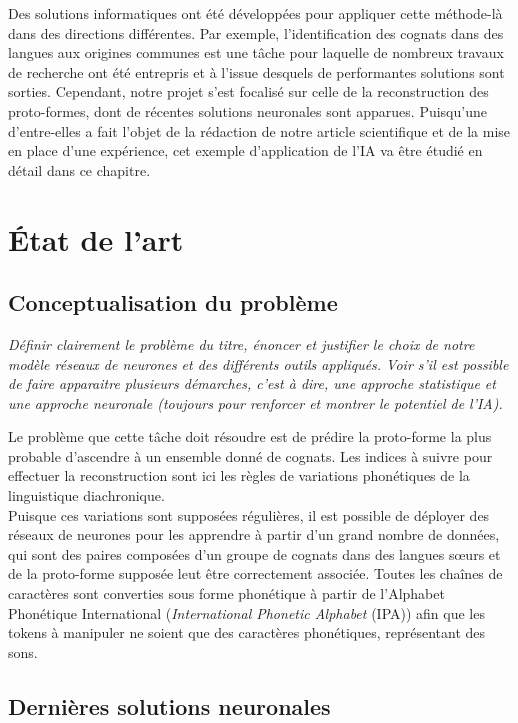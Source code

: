 \documentclass[12pt, french, twoside]{report}
\begin{document}
Des solutions informatiques ont été développées pour appliquer cette méthode-là dans des directions différentes. Par exemple, l'identification des cognats dans des langues aux origines communes est une tâche pour laquelle de nombreux travaux de recherche ont été entrepris et à l'issue desquels de performantes solutions sont sorties.\cite{fourrier}\cite[2: Related Works]{meloni-etal-2021-ab} Cependant, notre projet s'est focalisé sur celle de la reconstruction des proto-formes, dont de récentes solutions neuronales sont apparues. Puisqu'une d'entre-elles a fait l'objet de la rédaction de notre article scientifique et de la mise en place d'une expérience, cet exemple d'application de l'IA va être étudié en détail dans ce chapitre.
\section{État de l'art}
\subsection{Conceptualisation du problème}
\textit{Définir clairement le problème du titre, énoncer et justifier le choix de notre modèle réseaux de neurones et des différents outils appliqués. Voir s'il est possible de faire apparaitre plusieurs démarches, c'est à dire, une approche statistique et une approche neuronale (toujours pour renforcer et montrer le potentiel de l'IA).}

Le problème que cette tâche doit résoudre est de prédire la proto-forme la plus probable d'ascendre à un ensemble donné de cognats. Les indices à suivre pour effectuer la reconstruction sont ici les règles de variations phonétiques de la linguistique diachronique.\\
Puisque ces variations sont supposées régulières, il est possible de déployer des réseaux de neurones pour les apprendre à partir d'un grand nombre de données, qui sont des paires composées d'un groupe de cognats dans des langues s\oe{}urs et de la proto-forme supposée leut être correctement associée. Toutes les chaînes de caractères sont converties sous forme phonétique à partir de l'Alphabet Phonétique International (\textit{International Phonetic Alphabet} (IPA)) afin que les tokens à manipuler ne soient que des caractères phonétiques, représentant des sons.


\subsection{Dernières solutions neuronales}
\end{document}
